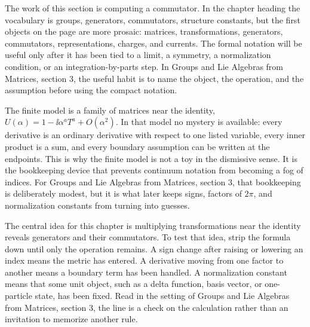 











The work of this section is computing a commutator.  In the chapter heading the vocabulary is groups, generators, commutators, structure constants, but the first objects on the page are more prosaic: matrices, transformations, generators, commutators, representations, charges, and currents.  The formal notation will be useful only after it has been tied to a limit, a symmetry, a normalization condition, or an integration-by-parts step.  In Groups and Lie Algebras from Matrices, section 3, the useful habit is to name the object, the operation, and the assumption before using the compact notation.

The finite model is a family of matrices near the identity, \(U(\alpha)=1-\ii\alpha^aT^a+O(\alpha^2)\).  In that model no mystery is available: every derivative is an ordinary derivative with respect to one listed variable, every inner product is a sum, and every boundary assumption can be written at the endpoints.  This is why the finite model is not a toy in the dismissive sense.  It is the bookkeeping device that prevents continuum notation from becoming a fog of indices.  For Groups and Lie Algebras from Matrices, section 3, that bookkeeping is deliberately modest, but it is what later keeps signs, factors of \(2\pi\), and normalization constants from turning into guesses.

The central idea for this chapter is multiplying transformations near the identity reveals generators and their commutators.  To test that idea, strip the formula down until only the operation remains.  A sign change after raising or lowering an index means the metric has entered.  A derivative moving from one factor to another means a boundary term has been handled.  A normalization constant means that some unit object, such as a delta function, basis vector, or one-particle state, has been fixed.  Read in the setting of Groups and Lie Algebras from Matrices, section 3, the line is a check on the calculation rather than an invitation to memorize another rule.

